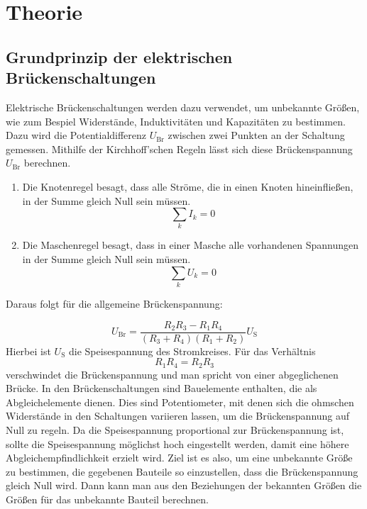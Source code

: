 \section{Theorie} \label{sec:Theorie}

\subsection{Grundprinzip der elektrischen Brückenschaltungen}

   Elektrische Brückenschaltungen werden dazu verwendet, um unbekannte Größen, wie zum Bespiel Widerstände, Induktivitäten und
   Kapazitäten zu bestimmen.
   Dazu wird die Potentialdifferenz $U_\text{Br}$ zwischen zwei Punkten an der Schaltung gemessen.
   Mithilfe der Kirchhoff'schen Regeln lässt sich diese Brückenspannung $U_\text{Br}$ berechnen.
   \begin{enumerate}
       \item Die Knotenregel besagt, dass alle Ströme, die in einen Knoten hineinfließen, in der Summe gleich Null sein müssen.
       \begin{equation}
           \sum_k I_k = 0
       \end{equation}
       \item Die Maschenregel besagt, dass in einer Masche alle vorhandenen Spannungen in der Summe gleich Null sein müssen.
       \begin{equation}
           \sum_k U_k = 0
       \end{equation}
   \end{enumerate}


   Daraus folgt für die allgemeine Brückenspannung:

   \begin{equation}
       U_\text{Br} = \frac{R_2R_3 - R_1R_4}{(R_3 + R_4)(R_1 + R_2)} U_\text{S}
   \end{equation}
   Hierbei ist $U_\text{S}$ die Speisespannung des Stromkreises.
   Für das Verhältnis
   \begin{equation}
       R_1R_4 = R_2R_3 \label{eqn: Widerstände}
   \end{equation}
   verschwindet die Brückenspannung und man spricht von einer abgeglichenen Brücke.
   In den Brückenschaltungen sind Bauelemente enthalten, die als Abgleichelemente dienen.
   Dies sind Potentiometer, mit denen sich die ohmschen Widerstände in den Schaltungen variieren lassen, um
   die Brückenspannung auf Null zu regeln.
   Da die Speisespannung proportional zur Brückenspannung ist, sollte die Speisespannung möglichst hoch eingestellt werden,
   damit eine höhere Abgleichempfindlichkeit erzielt wird.
   Ziel ist es also, um eine unbekannte Größe zu bestimmen, die gegebenen Bauteile so einzustellen, dass
   die Brückenspannung gleich Null wird. Dann kann man aus den Beziehungen der bekannten Größen die Größen für das unbekannte Bauteil berechnen.

